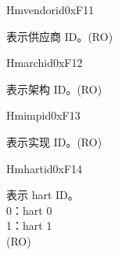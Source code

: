\begin{register}{H}{mvendorid}{0xF11}\label{regdesc:MVENDORID}
%
\regnewline%
\begin{regdesc}\begin{reglist}
\label{fielddesc:MVENDORID}\item [MVENDORID] 表示供应商 ID。(RO)
\end{reglist}\end{regdesc}
\end{register}

\begin{register}{H}{marchid}{0xF12}\label{regdesc:MARCHID}
%
\regnewline%
\begin{regdesc}\begin{reglist}
\label{fielddesc:MARCHID}\item [MARCHID] 表示架构 ID。(RO)
\end{reglist}\end{regdesc}
\end{register}

\begin{register}{H}{mimpid}{0xF13}\label{regdesc:MIMPID}
%
\regnewline%
\begin{regdesc}\begin{reglist}
\label{fielddesc:MIMPID}\item [MIMPID] 表示实现 ID。(RO)
\end{reglist}\end{regdesc}
\end{register}

\begin{register}{H}{mhartid}{0xF14}\label{regdesc:MHARTID}
%
\regnewline%
\begin{regdesc}\begin{reglist}
\label{fielddesc:MHARTID}\item [MHARTID] 表示 hart ID。\\
0：hart 0\\
1：hart 1\\
(RO)
\end{reglist}\end{regdesc}
\end{register}

